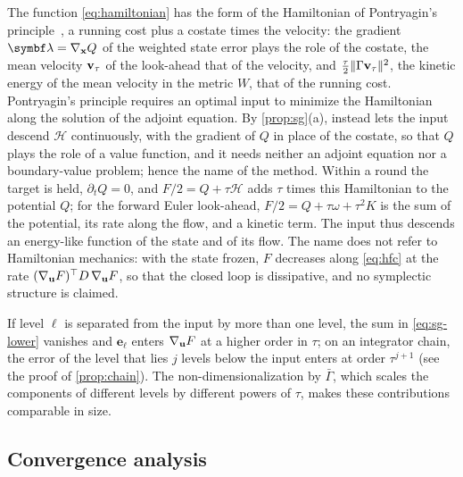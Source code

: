 \begin{remark}\label{rem:hamiltonian}
The function \eqref{eq:hamiltonian} has the form of the Hamiltonian of Pontryagin's
principle~\citep{pontryagin1962mathematical}, a running cost plus a costate times the velocity: the
gradient $\blambda = \nabla_{\bx}Q$ of the weighted state error plays the role of the costate, the
mean velocity $\mathbf{v}_\tau$ of the look-ahead that of the velocity, and $\frac{\tau}{2}\lVert\Gamma
\mathbf{v}_\tau\rVert^2$, the kinetic energy of the mean velocity in the metric $W$, that of the running cost.
Pontryagin's principle requires an optimal input to minimize the Hamiltonian along the solution of
the adjoint equation.
By \cref{prop:sg}(a), \method{} instead lets the input descend $\mathcal{H}$ continuously, with the
gradient of $Q$ in place of the costate, so that $Q$ plays the role of a value function, and it needs
neither an adjoint equation nor a boundary-value problem; hence the name of the method.
Within a round the target is held, $\partial_t Q = 0$, and $F/2 = Q + \tau\mathcal{H}$ adds $\tau$
times this Hamiltonian to the potential $Q$; for the forward Euler look-ahead, $F/2 = Q + \tau\omega +
\tau^2 K$ is the sum of the potential, its rate along the flow, and a kinetic term.
The input thus descends an energy-like function of the state and of its flow.
The name does not refer to Hamiltonian mechanics: with the state frozen, $F$ decreases along
\eqref{eq:hfc} at the rate $(\nabla_{\mathbf{u}}F)^\top D\,\nabla_{\mathbf{u}}F$, so that the closed loop is
dissipative, and no symplectic structure is claimed.
\end{remark}

\begin{remark}\label{rem:sg-levels}
If level $\ell$ is separated from the input by more than one level, the sum in \eqref{eq:sg-lower}
vanishes and $\mathbf{e}_\ell$ enters $\nabla_{\mathbf{u}}F$ at a higher order in $\tau$; on an integrator
chain, the error of the level that lies $j$ levels below the input enters at order $\tau^{j+1}$
(see the proof of \cref{prop:chain}).
The non-dimensionalization by $\bar\Gamma$, which scales the components of different levels by
different powers of $\tau$, makes these contributions comparable in size.
\end{remark}

\subsection{Convergence analysis}\label{sec:convergence}

